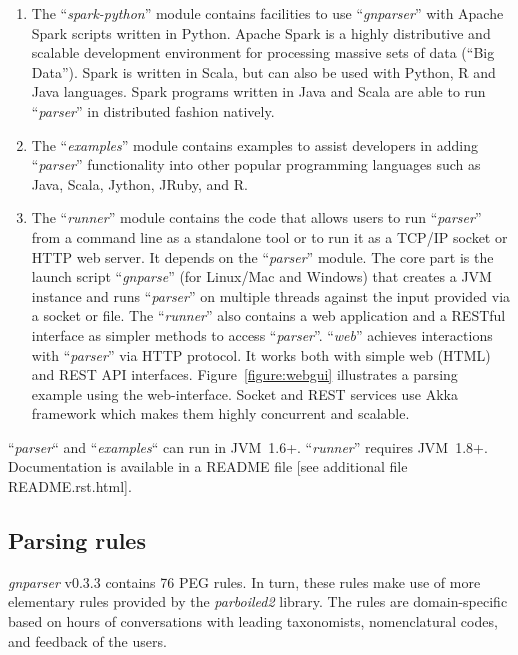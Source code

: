 \documentclass{bmcart}
\begin{document}
\begin{enumerate}
\begin{itemize}
\end{itemize}

  \item The ``\textit{spark-python}'' module contains facilities to use ``\textit{gnparser}'' with Apache Spark scripts written in Python. Apache Spark is a highly distributive and scalable development environment for processing massive sets of data (``Big Data''). Spark is written in Scala, but can also be used with Python, R and Java languages. Spark programs written in Java and Scala are able to run ``\textit{parser}'' in distributed fashion natively. 

  \item The ``\textit{examples}'' module contains examples to assist developers in adding ``\textit{parser}'' functionality into other popular programming languages such as Java, Scala, Jython, JRuby, and R.

  \item The ``\textit{runner}'' module contains the code that allows users to run ``\textit{parser}'' from a command line as a standalone tool or to run it as a TCP/IP socket or HTTP web server. It depends on the ``\textit{parser}'' module. The core part is the launch script ``\textit{gnparse}'' (for Linux/Mac and Windows) that creates a JVM instance and runs ``\textit{parser}'' on multiple threads against the input provided via a socket or file. The ``\textit{runner}'' also contains a web application and a RESTful interface as simpler methods to access ``\textit{parser}''. ``\textit{web}'' achieves interactions with ``\textit{parser}'' via HTTP protocol. It works both with simple web (HTML) and REST API interfaces. Figure~\ref{figure:webgui} illustrates a parsing example using the web-interface. Socket and REST services use Akka framework which makes them highly concurrent and scalable.

\end{enumerate}

``\textit{parser}`` and ``\textit{examples}`` can run in JVM~1.6+.  ``\textit{runner}'' requires JVM~1.8+. Documentation is available in a README file [see additional file README.rst.html].

\subsection*{Parsing rules}


\textit{gnparser} v0.3.3 contains 76 PEG rules. In turn, these rules make use of more elementary rules provided by the \textit{parboiled2} library. The rules are domain-specific based on hours of conversations with leading taxonomists, nomenclatural codes, and feedback of the users. 
\end{document}
